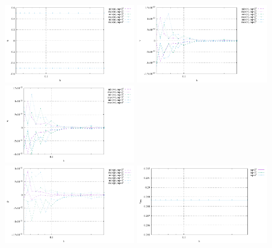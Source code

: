 \begin{center}
\includegraphics[width=5.7cm]{python_codes/fieldstone_82/RESULTS/bench2/u.pdf}
\includegraphics[width=5.7cm]{python_codes/fieldstone_82/RESULTS/bench2/v.pdf}
\includegraphics[width=5.7cm]{python_codes/fieldstone_82/RESULTS/bench2/w.pdf}\\
\includegraphics[width=5.7cm]{python_codes/fieldstone_82/RESULTS/bench2/p.pdf}
\includegraphics[width=5.7cm]{python_codes/fieldstone_82/RESULTS/bench2/vrms.pdf}
\end{center}










\newpage
